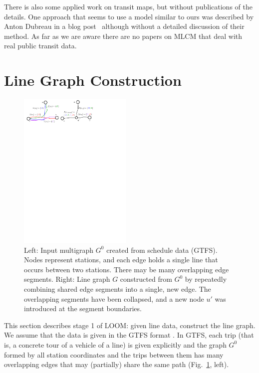 \documentclass[sigconf]{acmart}
\begin{document}
There is also some applied work on transit maps, but without publications of the details.
One approach that seems to use a model similar to ours was described by Anton Dubreau in a blog post~\cite{dub16} although without a detailed discussion of their method. As far as we are aware there are no papers on MLCM that deal with real public transit data.

%
\section{Line Graph Construction}\label{SEC:graph}
%
\begin{figure}[t]
  \centering
  \includegraphics[width=0.48\textwidth]{linegraph.pdf}
  \caption{Left: Input multigraph $G^0$ created from schedule data (GTFS). Nodes represent stations, and each edge holds a single line that occurs between two stations. There may be many overlapping edge segments. Right: Line graph $G$ constructed from $G^0$ by repeatedly combining shared edge segments into a single, new edge. The overlapping segments have been collapsed, and a new node $u'$ was introduced at the segment boundaries.}  
  \label{FIG:linegraph}
\end{figure}

This section describes stage 1 of LOOM: given line data, construct the line graph.
We assume that the data is given in the GTFS format \cite{gtfs}.
In GTFS, each trip (that is, a concrete tour of a vehicle of a line) is given explicitly and the graph $G^0$ formed by all station coordinates and the trips between them has many overlapping edges that may (partially) share the same path (Fig.~\ref{FIG:linegraph}, left).
\end{document}
